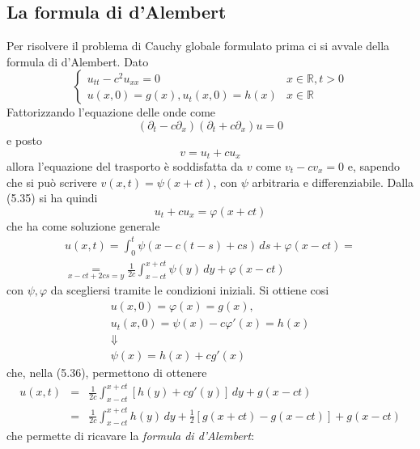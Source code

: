 \documentclass[a4paper,12pt, draft]{article}
\theoremstyle{break}
\let\phi\varphi
\numberwithin{equation}{section}
\begin{document}
\subsection{La formula di d'Alembert}
Per risolvere il problema di Cauchy globale formulato prima ci si avvale della formula di d'Alembert. Dato 
\begin{equation}
  \begin{cases}
    u_{tt} - c^2u_{xx}= 0 & x \in \mathbb{R}, t > 0 \\
    u(x,0) = g(x), u_t(x,0) = h(x) & x \in \mathbb{R}
  \end{cases}
\end{equation}
Fattorizzando l'equazione delle onde come
\begin{equation}
  (\partial_t - c\partial_x)(\partial_t + c\partial_x)u = 0
\end{equation}
e posto 
\begin{equation}
  v  = u_t + cu_x
\end{equation}
allora l'equazione del trasporto è soddisfatta da \(v\) come \(v_t - cv_x = 0\) e, sapendo che si può scrivere \(v(x,t) = \psi(x+ct)\), con \(\psi\) arbitraria e differenziabile. Dalla (5.35) si ha quindi
\[
u_t + cu_x = \phi(x+ct)  
\]
che ha come soluzione generale
\begin{equation}
  \begin{array}{r}
    u(x,t) = \int_0^t \psi(x-c(t-s) + cs) \, ds + \phi(x - ct) = \\
  \underset{x -ct +2cs = y}{=} \frac{1}{2c}\int_{x-ct}^{x+ct} \psi(y) \, dy + \phi(x-ct)
\end{array}
\end{equation}
con \(\psi, \phi\) da scegliersi tramite le condizioni iniziali. Si ottiene cosi
\[
  \begin{array}{c}
  u(x,0) = \phi(x) = g(x), \\
  u_t (x,0) = \psi(x) - c\phi'(x) = h(x) \\
  \Downarrow \\
  \psi(x) = h(x) + cg'(x)
\end{array}
\]
che, nella (5.36), permettono di ottenere 
\[
  \begin{array}{lcl}
    u(x, t) & = & \frac{1}{2c} \int_{x-ct}^{x+ct} [h(y) + cg'(y)] \, dy + g(x - ct) \\
    & = & \frac{1}{2c} \int_{x-ct}^{x+ct}h(y) \, dy + \frac{1}{2} [g(x+ct) - g(x-ct)] + g(x-ct)
  \end{array}
  \]
  che permette di ricavare la \emph{formula di d'Alembert}:
\end{document}
